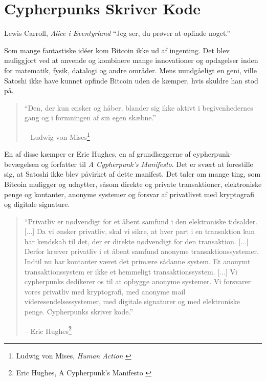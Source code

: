 \chapter{Cypherpunks Skriver Kode}
\label{les:20}

\begin{chapquote}{Lewis Carroll, \textit{Alice i Eventyrland}}
\enquote{Jeg ser, du prøver at opfinde noget.}
\end{chapquote}

Som mange fantastiske idéer kom Bitcoin ikke ud af ingenting. Det blev
muliggjort ved at anvende og kombinere mange innovationer og opdagelser inden for
matematik, fysik, datalogi og andre områder. Mens
uundgåeligt en geni, ville Satoshi ikke have kunnet opfinde Bitcoin
uden de kæmper, hvis skuldre han stod på.

\begin{quotation}\begin{samepage}
\enquote{Den, der kun ønsker og håber, blander sig ikke aktivt i begivenhedernes gang
og i formningen af sin egen skæbne.}
\begin{flushright} -- Ludwig von Mises\footnote{Ludwig von Mises, \textit{Human Action} \cite{human-action}}
\end{flushright}\end{samepage}\end{quotation}

En af disse kæmper er Eric Hughes, en af grundlæggerne af cypherpunk-bevægelsen og forfatter til \textit{A Cypherpunk's Manifesto}. Det er svært at forestille sig, at Satoshi ikke blev påvirket af dette manifest. Det taler om mange ting, som Bitcoin muliggør og udnytter, såsom direkte og private transaktioner, elektroniske penge og kontanter, anonyme systemer og forsvar af privatlivet med kryptografi og digitale signature.

\begin{quotation}\begin{samepage}
\enquote{Privatliv er nødvendigt for et åbent samfund i den elektroniske tidsalder.
[...] Da vi ønsker privatliv, skal vi sikre, at hver part i en
transaktion kun har kendskab til det, der er direkte nødvendigt
for den transaktion. [...]
Derfor kræver privatliv i et åbent samfund anonyme transaktionssystemer. Indtil nu har kontanter været det primære sådanne system. Et anonymt transaktionssystem er ikke et hemmeligt transaktionssystem.
[...]
Vi cypherpunks dedikerer os til at opbygge anonyme systemer. Vi forsvarer vores privatliv med kryptografi, med anonyme mail
videresendelsessystemer, med digitale signaturer og med elektroniske
penge.
Cypherpunks skriver kode.}
\begin{flushright} -- Eric Hughes\footnote{Eric Hughes, A Cypherpunk's Manifesto \cite{cypherpunk-manifesto}}
\end{flushright}\end{samepage}\end{quotation}

